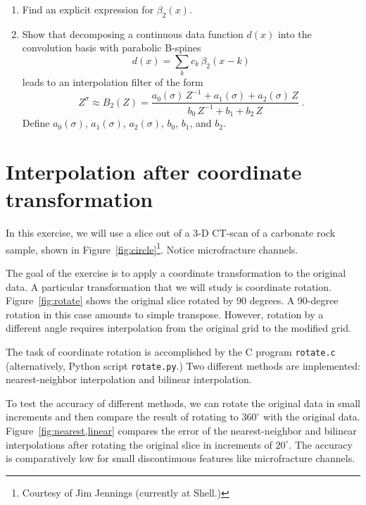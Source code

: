 \begin{enumerate}
\begin{enumerate}
\item Find an explicit expression for $\beta_2(x)$.
\item Show that decomposing a continuous data function $d(x)$ into the convolution basis 
  with parabolic B-spines
  \begin{equation}
    \label{eq:basis} 
    d(x) = \sum\limits_k c_k\,\beta_2(x-k)
  \end{equation}
  leads to an interpolation filter of the form
  \begin{equation}
    \label{eq:bz}
    Z^{\sigma} \approx B_2(Z) = \frac{a_0(\sigma)\,Z^{-1} + a_1(\sigma) + a_2(\sigma)\,Z}{b_0\,Z^{-1} + b_1 + b_2\,Z}\;.
  \end{equation}
  Define $a_0(\sigma)$, $a_1(\sigma)$, $a_2(\sigma)$, $b_0$, $b_1$, and $b_2$.
\end{enumerate}

\end{enumerate}

\section{Interpolation after coordinate transformation}

In this exercise, we will use a slice out of a 3-D CT-scan of a
carbonate rock sample, shown in
Figure~\ref{fig:circle}\footnote{Courtesy of Jim Jennings
  (currently at Shell.)}. Notice microfracture channels.


The goal of the exercise is to apply a coordinate transformation to
the original data. A particular transformation that we will study is
coordinate rotation. Figure~\ref{fig:rotate} shows the original slice
rotated by 90 degrees. A 90-degree rotation in this case amounts to
simple transpose. However, rotation by a different angle requires
interpolation from the original grid to the modified grid.

The task of coordinate rotation is accomplished by the C program
\texttt{rotate.c} (alternatively, Python script \texttt{rotate.py}.) Two different methods are implemented: 
nearest-neighbor interpolation and bilinear interpolation.

To test the accuracy of different methods, we can rotate the original
data in small increments and then compare the result of rotating to
$360^{\circ}$ with the original data. Figure~\ref{fig:nearest,linear}
compares the error of the nearest-neighbor and bilinear interpolations
after rotating the original slice in increments of $20^{\circ}$. The
accuracy is comparatively low for small discontinuous features like
microfracture channels.

